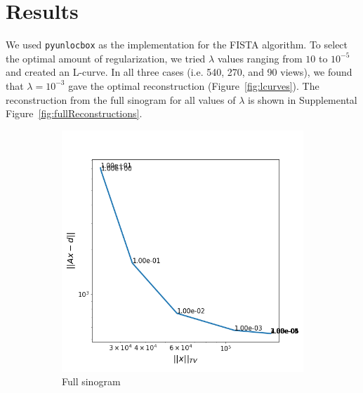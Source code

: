 \documentclass[11pt]{article}
\begin{document}
\section*{Results}
We used \texttt{pyunlocbox} as the implementation for the FISTA algorithm. To select the optimal amount of regularization, we tried $\lambda$ values ranging from $10$ to $10^{-5}$ and created an L-curve. In all three cases (i.e. 540, 270, and 90 views), we found that $\lambda = 10^{-3}$ gave the optimal reconstruction (Figure~\ref{fig:lcurves}). The reconstruction from the full sinogram for all values of $\lambda$ is shown in Supplemental Figure~\ref{fig:fullReconstructions}.

\begin{figure}[h]
	\begin{subfigure}[t]{0.3\textwidth}
		\includegraphics[width=\linewidth]{results/fistaFullLcurve.png}
		\caption{Full sinogram}
		\label{fig:lcurvefull}
	\end{subfigure}
	\hfill
	\begin{subfigure}[t]{0.3\textwidth}

\end{subfigure}
\end{figure}
\end{document}
